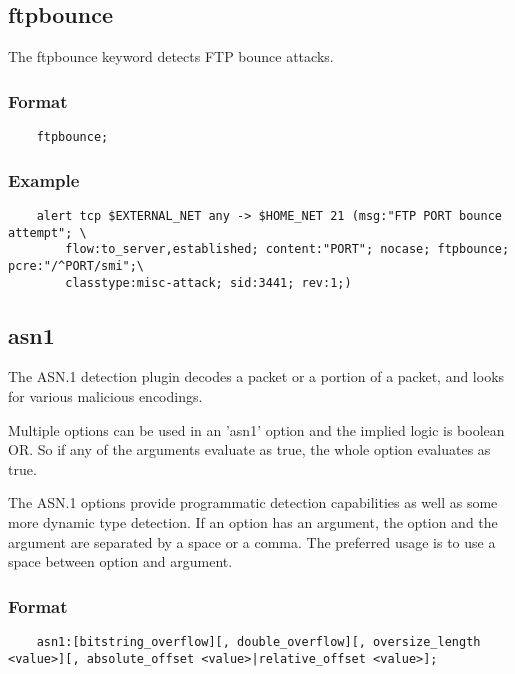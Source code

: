 \documentclass[english]{report}
\begin{document}
\subsection{ftpbounce}

The ftpbounce keyword detects FTP bounce attacks.

\subsubsection{Format}
                                                                                
\begin{verbatim}
    ftpbounce;
\end{verbatim}

\subsubsection{Example}

\begin{verbatim}
    alert tcp $EXTERNAL_NET any -> $HOME_NET 21 (msg:"FTP PORT bounce attempt"; \
        flow:to_server,established; content:"PORT"; nocase; ftpbounce; pcre:"/^PORT/smi";\
        classtype:misc-attack; sid:3441; rev:1;)
\end{verbatim}

\subsection{asn1}
\label{asn1}

The ASN.1 detection plugin decodes a packet or a portion of a packet, and looks
for various malicious encodings.

Multiple options can be used in an 'asn1' option and the implied logic is
boolean OR.  So if any of the arguments evaluate as true, the whole option
evaluates as true.

The ASN.1 options provide programmatic detection capabilities as well as some
more dynamic type detection.  If an option has an argument, the option and the
argument are separated by a space or a comma.  The preferred usage is to use a
space between option and argument.

\subsubsection{Format}

\begin{verbatim}
    asn1:[bitstring_overflow][, double_overflow][, oversize_length <value>][, absolute_offset <value>|relative_offset <value>];
\end{verbatim}
\end{document}
